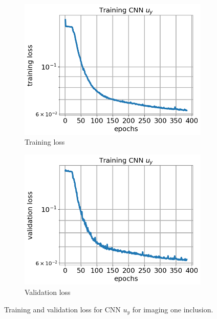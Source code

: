 \documentclass[12pt]{article}
\newcommand{\nhgfigheight}{4.0cm}
\begin{document}
\begin{figure}[h]
  \centering
  \begin{subfigure}[b]{0.45\linewidth}
    \includegraphics[totalheight=\nhgfigheight]{Figures/final1/training/uy/field_imagesy_plot_loss.png}
    \caption{Training loss}
  \end{subfigure}
  \begin{subfigure}[b]{0.45\linewidth}
    \includegraphics[totalheight=\nhgfigheight]{Figures/final1/training/uy/field_imagesy_plot_val_loss.png}
    \caption{Validation loss}
  \end{subfigure}
  \caption{\label{fig:oneinc:trainuy} Training and validation loss for CNN $u_y$ for imaging one inclusion.}
\end{figure}
\end{document}
